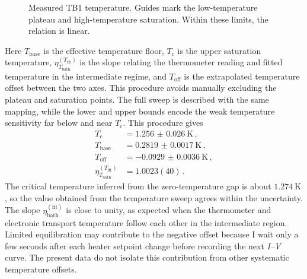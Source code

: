         \begin{figure}
            \captionsetup{format=plain}%
            \centering
            \vspace{-0.5em}
            \vspace{-1.5em}
            \caption{
                    Measured TB1 temperature. Guides mark the low-temperature plateau and high-temperature saturation. Within these limits, the relation is linear.
                }
            \label{fig:tb:highres:temperature:fit}
        \end{figure}

        Here $T_\mathrm{base}$ is the effective temperature floor, $T_\mathrm{c}$ is the upper saturation temperature, $\eta_{T_\mathrm{bath}}^{(T_\mathrm{fit})}$ is the slope relating the thermometer reading and fitted temperature in the intermediate regime, and $T_\mathrm{off}$ is the extrapolated temperature offset between the two axes. This procedure avoids manually excluding the plateau and saturation points. The full sweep is described with the same mapping, while the lower and upper bounds encode the weak temperature sensitivity far below and near $T_\mathrm{c}$. This procedure gives
        \begin{equation}
            \begin{aligned}
                T_\mathrm{c} &= \qty{1.256(26)}{\kelvin}\,,\\
                T_\mathrm{base} &= \qty{0.2819(17)}{\kelvin}\,,\\
                T_\mathrm{off} &= \qty{-0.0929(36)}{\kelvin}\,,\\
                \eta_{T_\mathrm{bath}}^{(T_\mathrm{fit})} &= 1.0023(40)\,.
            \end{aligned}
            \label{eq:tb:highres:temperature:parameters}
        \end{equation}
        The critical temperature inferred from the zero-temperature gap is about $\qty{1.274}{\kelvin}$, so the value obtained from the temperature sweep agrees within the uncertainty. The slope $\eta_\mathrm{bath}^{(\mathrm{fit})}$ is close to unity, as expected when the thermometer and electronic transport temperature follow each other in the intermediate region. Limited equilibration may contribute to the negative offset because I wait only a few seconds after each heater setpoint change before recording the next \textit{I--V} curve. The present data do not isolate this contribution from other systematic temperature offsets.

